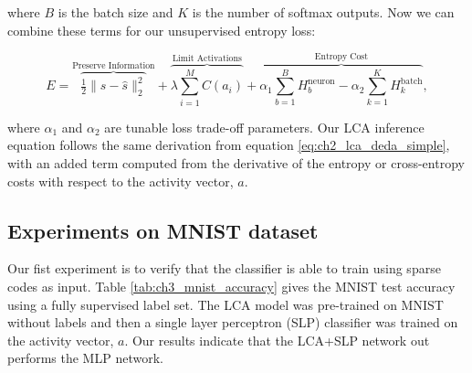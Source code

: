 \noindent where $B$ is the batch size and $K$ is the number of softmax outputs. Now we can combine these terms for our unsupervised entropy loss:

\begin{equation}\label{eq:ch3_lcaf_unsupervised_energy}
         E =
        \overbrace{ \tfrac{1}{2} \| s - \hat{s} \|_{2}^{2} }^\text{Preserve Information} +
        \overbrace{ \lambda \sum\limits_{i=1}^{M}C(a_{i}) }^\text{Limit Activations} +
        \overbrace{ \alpha_{1} \sum\limits_{b=1}^{B} H^{\text{neuron}}_{b} - \alpha_{2} \sum\limits_{k=1}^{K}H^{\text{batch}}_{k}}^\text{Entropy Cost},
\end{equation}

\noindent where $\alpha_{1}$ and $\alpha_{2}$ are tunable loss trade-off parameters. Our LCA inference equation follows the same derivation from equation \eqref{eq:ch2_lca_deda_simple}, with an added term computed from the derivative of the entropy or cross-entropy costs with respect to the activity vector, $a$.


\subsection{Experiments on MNIST dataset}
Our fist experiment is to verify that the classifier is able to train using sparse codes as input. Table \ref{tab:ch3_mnist_accuracy} gives the MNIST test accuracy using a fully supervised label set. The LCA model was pre-trained on MNIST without labels and then a single layer perceptron (SLP) classifier was trained on the activity vector, $a$. Our results indicate that the LCA+SLP network out performs the MLP network.

